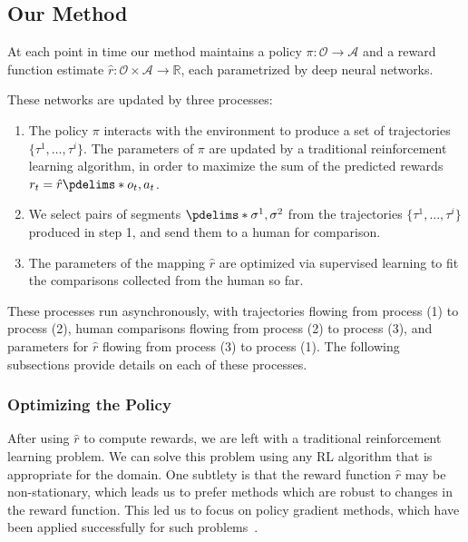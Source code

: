 \subsection{Our Method}

At each point in time our method maintains a policy $\pi : \mathcal{O} \rightarrow \mathcal{A}$
and a reward function estimate $\hat{r} : \mathcal{O} \times \mathcal{A} \rightarrow \mathbb{R}$,
each parametrized by deep neural networks.

These networks are updated by three processes:

\begin{enumerate}
\item The policy $\pi$ interacts with the environment to produce a set of trajectories $\{ \tau^1, \ldots, \tau^i \}$.
    The parameters of $\pi$ are updated by a traditional reinforcement learning algorithm, in order to maximize the sum of the predicted rewards $r_t = \hat{r}\pdelims*{o_t, a_t}$.
\item We select pairs of segments $\pdelims*{\sigma^1, \sigma^2}$
    from the trajectories $\{ \tau^1, \ldots, \tau^i \}$ produced in step 1, and send them to a human for comparison.
\item The parameters of the mapping $\hat{r}$ are optimized via supervised learning to fit the comparisons collected from the human so far.
\end{enumerate}

These processes run asynchronously, with trajectories flowing from process (1) to process (2), human comparisons flowing from process (2) to process (3), and parameters for $\hat{r}$ flowing from process (3) to process (1). The following subsections provide details on each of these processes.

\subsubsection{Optimizing the Policy}
\label{sssec:optimizing-the-policy}

After using $\hat{r}$ to compute rewards, we are left with a traditional reinforcement learning problem. We can solve this problem using any RL algorithm that is appropriate for the domain. One subtlety is that the reward function $\hat{r}$ may be non-stationary, which leads us to prefer methods which are robust to changes in the reward function. This led us to focus on policy gradient methods, which have been applied successfully for such problems~\citep{Ho16}.

